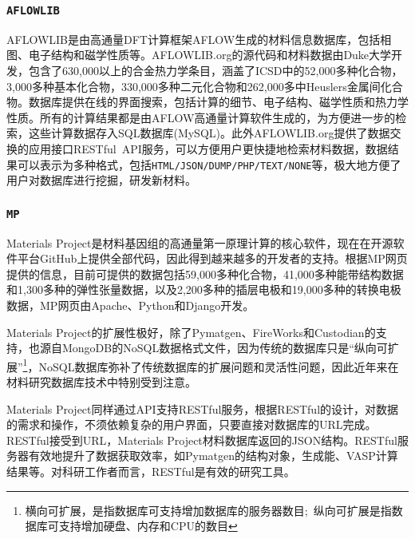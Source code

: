 \frame
{
\frametitle{\tt{AFLOWLIB}}
\textrm{AFLOWLIB}是由高通量\textrm{DFT}计算框架\textrm{AFLOW}\cite{CMS58-218_2012,CMS58-227_2012,Nat-Mater12-191_2013}生成的材料信息数据库，包括相图、电子结构和磁学性质等。\textrm{AFLOWLIB.org}的源代码和材料数据由\textrm{Duke}大学开发\cite{AFLOWORG_URL}，包含了630,000以上的合金热力学条目，涵盖了\textrm{ICSD}中的52,000多种化合物，3,000多种基本化合物，330,000多种二元化合物和262,000多中\textrm{Heuslers}金属间化合物。数据库提供在线的界面搜索，包括计算的细节、电子结构、磁学性质和热力学性质。所有的计算结果都是由\textrm{AFLOW}高通量计算软件生成的，为方便进一步的检索，这些计算数据存入\textrm{SQL}数据库(\textrm{MySQL})。此外\textrm{AFLOWLIB.org}提供了数据交换的应用接口\textrm{RESTful~API}服务\cite{CMS93-178_2014}，可以方便用户更快捷地检索材料数据，数据结果可以表示为多种格式，包括\texttt{HTML/JSON/DUMP/PHP/TEXT/NONE}等，极大地方便了用户对数据库进行挖掘，研发新材料。
}

\frame
{
\frametitle{\tt{MP}}
\textrm{Materials Project}是材料基因组的高通量第一原理计算的核心软件\cite{MP_URL}，现在在开源软件平台\textrm{GitHub}\cite{MP_Github}上提供全部代码，因此得到越来越多的开发者的支持。根据\textrm{MP}网页提供的信息\cite{MP_URL}，目前可提供的数据包括59,000多种化合物，41,000多种能带结构数据和1,300多种的弹性张量数据，以及2,200多种的插层电极和19,000多种的转换电极数据，\textrm{MP}网页由\textrm{Apache}、\textrm{Python}和\textrm{Django}开发。

\textrm{Materials Project}的扩展性极好，除了\textrm{Pymatgen}、\textrm{FireWorks}和\textrm{Custodian}的支持，也源自\textrm{MongoDB}的\textrm{NoSQL}数据格式文件，因为传统的数据库只是“纵向可扩展”\footnote{横向可扩展，是指数据库可支持增加数据库的服务器数目;~纵向可扩展是指数据库可支持增加硬盘、内存和\textrm{CPU}的数目}，\textrm{NoSQL}数据库弥补了传统数据库的扩展问题和灵活性问题，因此近年来在材料研究数据库技术中特别受到注意。

\textrm{Materials Project}同样通过\textrm{API}支持\textrm{RESTful}服务\cite{CMS68-314_2013}，根据\textrm{RESTful}的设计，对数据的需求和操作，不须依赖复杂的用户界面，只要直接对数据库的\textrm{URL}完成。\textrm{RESTful}接受到\textrm{URL}，\textrm{Materials Project}材料数据库返回的\textrm{JSON}结构。\textrm{RESTful}服务器有效地提升了数据获取效率，如\textrm{Pymatgen}的结构对象，\textrm{生成能}、\textrm{VASP}计算结果等。对科研工作者而言，\textrm{RESTful}是有效的研究工具。
}

